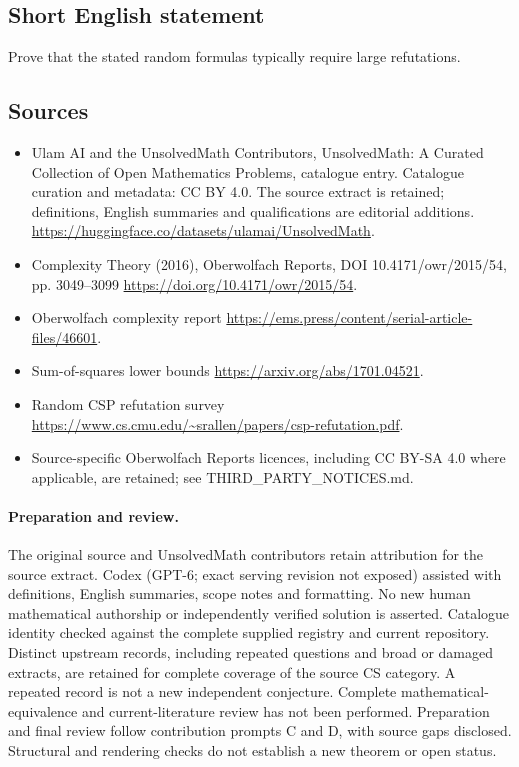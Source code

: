 \documentclass[11pt]{article}
\begin{document}
\subsection{Short English statement}
Prove that the stated random formulas typically require large refutations.
\subsection{Sources}
\begin{itemize}
\item[\hypertarget{source:statement:1}{S1}] Ulam AI and the UnsolvedMath Contributors, UnsolvedMath: A Curated Collection of Open Mathematics Problems, catalogue entry. Catalogue curation and metadata: CC BY 4.0. The source extract is retained; definitions, English summaries and qualifications are editorial additions.
\url{https://huggingface.co/datasets/ulamai/UnsolvedMath}.
\item[\hypertarget{source:statement:2}{S2}] Complexity Theory (2016), Oberwolfach Reports, DOI 10.4171/owr/2015/54, pp. 3049--3099
\url{https://doi.org/10.4171/owr/2015/54}.
\item[\hypertarget{source:statement:3}{S3}] Oberwolfach complexity report
\url{https://ems.press/content/serial-article-files/46601}.
\item[\hypertarget{source:statement:4}{S4}] Sum-of-squares lower bounds
\url{https://arxiv.org/abs/1701.04521}.
\item[\hypertarget{source:statement:5}{S5}] Random CSP refutation survey
\url{https://www.cs.cmu.edu/~srallen/papers/csp-refutation.pdf}.
\item Source-specific Oberwolfach Reports licences, including CC BY-SA 4.0 where applicable, are retained; see THIRD\_PARTY\_NOTICES.md.
\end{itemize}
\paragraph{Preparation and review.}
The original source and UnsolvedMath contributors retain attribution for the source extract. Codex (GPT-6; exact serving revision not exposed) assisted with definitions, English summaries, scope notes and formatting. No new human mathematical authorship or independently verified solution is asserted. Catalogue identity checked against the complete supplied registry and current repository. Distinct upstream records, including repeated questions and broad or damaged extracts, are retained for complete coverage of the source CS category. A repeated record is not a new independent conjecture. Complete mathematical-equivalence and current-literature review has not been performed. Preparation and final review follow contribution prompts C and D, with source gaps disclosed. Structural and rendering checks do not establish a new theorem or open status.
\label{end:statement}
\end{document}
